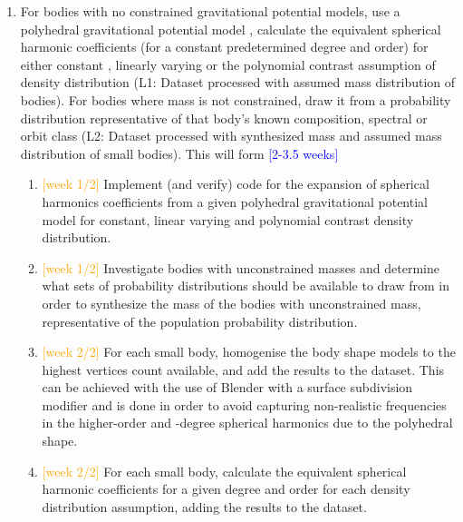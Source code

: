 \begin{enumerate}
    \item For bodies with no constrained gravitational potential models, use a polyhedral gravitational potential model \cite{Werner1996}, calculate the equivalent spherical harmonic coefficients (for a constant predetermined degree and order) for either constant \cite{Werner1997}, linearly varying \cite{Chen2019a} or the polynomial contrast \cite{Chen2019b} assumption of density distribution (L1: Dataset processed with assumed mass distribution of bodies). For bodies where mass is not constrained, draw it from a probability distribution representative of that body's known composition, spectral or orbit class (L2: Dataset processed with synthesized mass and assumed mass distribution of small bodies). This will form \textcolor{blue}{[2-3.5 weeks]}
    \begin{enumerate}
        \item \textcolor{orange}{[week 1/2]} Implement (and verify) code for the expansion of spherical harmonics coefficients from a given polyhedral gravitational potential model for constant, linear varying and polynomial contrast density distribution.
        \item \textcolor{orange}{[week 1/2]} Investigate bodies with unconstrained masses and determine what sets of probability distributions should be available to draw from in order to synthesize the mass of the bodies with unconstrained mass, representative of the population probability distribution.
        \item \textcolor{orange}{[week 2/2]} For each small body, homogenise the body shape models to the highest vertices count available, and add the results to the dataset. This can be achieved with the use of Blender with a surface subdivision modifier and is done in order to avoid capturing non-realistic frequencies in the higher-order and -degree spherical harmonics due to the polyhedral shape. 
        \item \textcolor{orange}{[week 2/2]} For each small body, calculate the equivalent spherical harmonic coefficients for a given degree and order for each density distribution assumption, adding the results to the dataset.
    \end{enumerate}
    

\end{enumerate}
